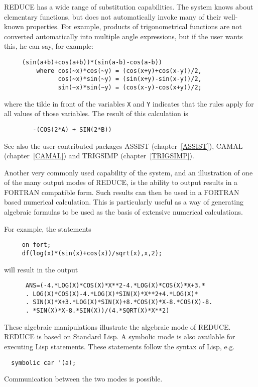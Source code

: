 \documentclass[11pt,letterpaper]{book}
\newcommand{\REDUCE}{REDUCE}
\newcommand{\extendedmanual}[1]{#1}
\begin{document}
{\REDUCE} has a wide range of substitution capabilities. The system knows
about elementary functions, but does not automatically invoke many of their
well-known properties. For example, products of trigonometrical functions
are not converted automatically into multiple angle expressions, but if the
user wants this, he can say, for example:
{\small\begin{verbatim}
     (sin(a+b)+cos(a+b))*(sin(a-b)-cos(a-b))
         where cos(~x)*cos(~y) = (cos(x+y)+cos(x-y))/2,
               cos(~x)*sin(~y) = (sin(x+y)-sin(x-y))/2,
               sin(~x)*sin(~y) = (cos(x-y)-cos(x+y))/2;
\end{verbatim}}
where the tilde in front of the variables {\tt X} and {\tt Y} indicates
that the rules apply for all values of those variables.
The result of this calculation is
{\small\begin{verbatim}
        -(COS(2*A) + SIN(2*B))
\end{verbatim}}
\extendedmanual{See also the user-contributed packages ASSIST
(chapter~\ref{ASSIST}), CAMAL (chapter~\ref{CAMAL}) and TRIGSIMP
(chapter~\ref{TRIGSIMP}).}

Another very commonly used capability of the system, and an illustration
of one of the many output modes of {\REDUCE}, is the ability to output
results in a FORTRAN compatible form.  Such results can then be used in a
FORTRAN based numerical calculation.  This is particularly useful as a way
of generating algebraic formulas to be used as the basis of extensive
numerical calculations.

For example, the statements
{\small\begin{verbatim}
     on fort;
     df(log(x)*(sin(x)+cos(x))/sqrt(x),x,2);
\end{verbatim}}
will result in the output
{\small\begin{verbatim}
      ANS=(-4.*LOG(X)*COS(X)*X**2-4.*LOG(X)*COS(X)*X+3.*
      . LOG(X)*COS(X)-4.*LOG(X)*SIN(X)*X**2+4.*LOG(X)*
      . SIN(X)*X+3.*LOG(X)*SIN(X)+8.*COS(X)*X-8.*COS(X)-8.
      . *SIN(X)*X-8.*SIN(X))/(4.*SQRT(X)*X**2)
\end{verbatim}}
These algebraic manipulations illustrate the algebraic mode of {\REDUCE}.
{\REDUCE} is based on Standard Lisp. A symbolic mode is also available for
executing Lisp statements. These statements follow the syntax of Lisp,
e.g.
{\small\begin{verbatim}
  symbolic car '(a);
\end{verbatim}}
Communication between the two modes is possible.
\end{document}
